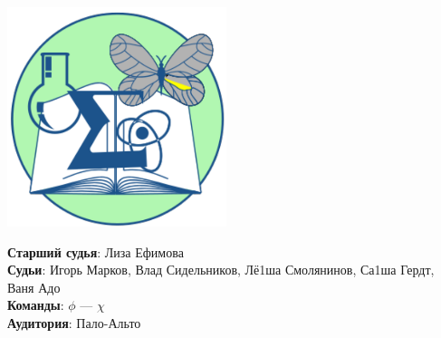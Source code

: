 \documentclass[12pt]{article}
\begin{document}
\begin{minipage}{.30\textwidth}
\begin{center}
\includegraphics[width=0.48\textwidth]{klshlogo.pdf}
\end{center}
\end{minipage}
\begin{minipage}{.65\textwidth}
\begin{flushleft}
{\bf Старший судья}: Лиза Ефимова\\ 
{\bf Судьи}: Игорь Марков, Влад Сидельников, Лё1ша Смолянинов, Са1ша Гердт, Ваня Адо\\ 
{\bf Команды}: $\phi$ --- $\chi$\\ 
{\bf Аудитория}: Пало-Альто\\ 
\end{flushleft}
\end{minipage}
\end{document}
